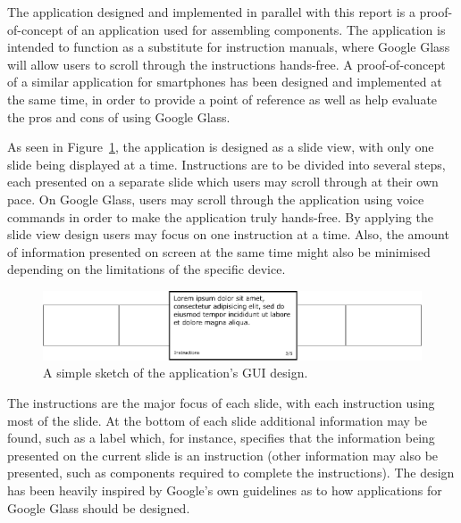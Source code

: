 The application designed and implemented in parallel with this report is a proof-of-concept of an application used for assembling components. The application is intended to function as a substitute for  instruction manuals, where Google Glass will allow users to scroll through the instructions hands-free. A proof-of-concept of a similar application for smartphones has been designed and implemented at the same time, in order to provide a point of reference as well as help evaluate the pros and cons of using Google Glass.

As seen in Figure~\ref{cardDesign}, the application is designed as a slide view, with only one slide being displayed at a time. Instructions are to be divided into several steps, each presented on a separate slide which users may scroll through at their own pace. On Google Glass, users may scroll through the application using voice commands in order to make the application truly hands-free. By applying the slide view design users may focus on one instruction at a time. Also, the amount of information presented on screen at the same time might also be minimised depending on the limitations of the specific device.

	\begin{figure}[ht!]
		\centering
		\includegraphics[width=150mm]{images/cardDesign2}
		\caption{A simple sketch of the application's GUI design.}
		\label{cardDesign}
	\end{figure}

The instructions are the major focus of each slide, with each instruction using most of the slide. At the bottom of each slide additional information may be found, such as a label which, for instance, specifies that the information being presented on the current slide is an instruction (other information may also be presented, such as components required to complete the instructions). The design has been heavily inspired by Google's own guidelines as to how applications for Google Glass should be designed.

